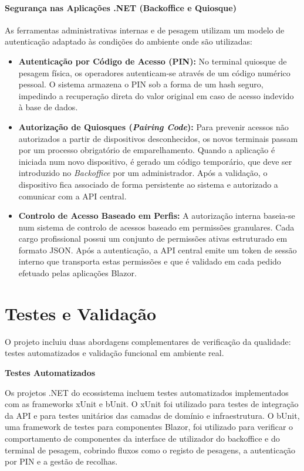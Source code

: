 \paragraph{Segurança nas Aplicações .NET (Backoffice e Quiosque)}
As ferramentas administrativas internas e de pesagem utilizam um modelo de autenticação adaptado às condições do ambiente onde são utilizadas:
\begin{itemize}
    \item \textbf{Autenticação por Código de Acesso (PIN):} No terminal quiosque de pesagem física, os operadores autenticam-se através de um código numérico pessoal. O sistema armazena o PIN sob a forma de um hash seguro, impedindo a recuperação direta do valor original em caso de acesso indevido à base de dados.
    \item \textbf{Autorização de Quiosques (\textit{Pairing Code}):} Para prevenir acessos não autorizados a partir de dispositivos desconhecidos, os novos terminais passam por um processo obrigatório de emparelhamento. Quando a aplicação é iniciada num novo dispositivo, é gerado um código temporário, que deve ser introduzido no \textit{Backoffice} por um administrador. Após a validação, o dispositivo fica associado de forma persistente ao sistema e autorizado a comunicar com a \ac{API} central.
    \item \textbf{Controlo de Acesso Baseado em Perfis:} A autorização interna baseia-se num sistema de controlo de acessos baseado em permissões granulares. Cada cargo profissional possui um conjunto de permissões ativas estruturado em formato \ac{JSON}. Após a autenticação, a API central emite um token de sessão interno que transporta estas permissões e que é validado em cada pedido efetuado pelas aplicações Blazor.
\end{itemize}

\section{Testes e Validação}\label{sec:testes}

O projeto incluiu duas abordagens complementares de verificação da qualidade: testes automatizados e validação funcional em ambiente real.

\noindent\textbf{Testes Automatizados}

Os projetos .NET do ecossistema incluem testes automatizados implementados com as frameworks xUnit e bUnit. O xUnit foi utilizado para testes de integração da API e para testes unitários das camadas de domínio e infraestrutura. O bUnit, uma framework de testes para componentes Blazor, foi utilizado para verificar o comportamento de componentes da interface de utilizador do backoffice e do terminal de pesagem, cobrindo fluxos como o registo de pesagens, a autenticação por PIN e a gestão de recolhas.

